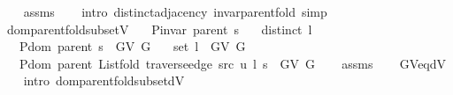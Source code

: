 \begin{isabellebody}
%
\isadelimproof
\ \ %
\endisadelimproof
%
\isatagproof
{}\isamarkupfalse%
\ assms\isanewline
\ \ \isamarkupfalse%
\ {\isacharparenleft}{\kern0pt}intro\ distinct{\isacharunderscore}{\kern0pt}adjacency\ invar{\isacharunderscore}{\kern0pt}parent{\isacharunderscore}{\kern0pt}fold{\isacharparenright}{\kern0pt}\ simp%
\endisatagproof
{\isafoldproof}%
%
\isadelimproof
%
\endisadelimproof
%
\isadelimdocument
%
\endisadelimdocument
%
\isatagdocument
%
\isamarkuptrue%
%
\endisatagdocument
{\isafolddocument}%
%
\isadelimdocument
%
\endisadelimdocument
{}\isamarkupfalse%
\ dom{\isacharunderscore}{\kern0pt}parent{\isacharunderscore}{\kern0pt}fold{\isacharunderscore}{\kern0pt}subset{\isacharunderscore}{\kern0pt}V{\isacharcolon}{\kern0pt}\isanewline
\ \ \ {\isachardoublequoteopen}P{\isacharunderscore}{\kern0pt}invar\ {\isacharparenleft}{\kern0pt}parent\ s{\isacharparenright}{\kern0pt}{\isachardoublequoteclose}\isanewline
\ \ \ {\isachardoublequoteopen}distinct\ l{\isachardoublequoteclose}\isanewline
\ \ \ {\isachardoublequoteopen}P{\isachardot}{\kern0pt}dom\ {\isacharparenleft}{\kern0pt}parent\ s{\isacharparenright}{\kern0pt}\ {\isasymsubseteq}\ G{\isachardot}{\kern0pt}V\ G{\isachardoublequoteclose}\isanewline
\ \ \ {\isachardoublequoteopen}set\ l\ {\isasymsubseteq}\ G{\isachardot}{\kern0pt}V\ G{\isachardoublequoteclose}\isanewline
\ \ \ {\isachardoublequoteopen}P{\isachardot}{\kern0pt}dom\ {\isacharparenleft}{\kern0pt}parent\ {\isacharparenleft}{\kern0pt}List{\isachardot}{\kern0pt}fold\ {\isacharparenleft}{\kern0pt}traverse{\isacharunderscore}{\kern0pt}edge\ src\ u{\isacharparenright}{\kern0pt}\ l\ s{\isacharparenright}{\kern0pt}{\isacharparenright}{\kern0pt}\ {\isasymsubseteq}\ G{\isachardot}{\kern0pt}V\ G{\isachardoublequoteclose}\isanewline
%
\isadelimproof
\ \ %
\endisadelimproof
%
\isatagproof
{}\isamarkupfalse%
\ assms\isanewline
\ \ \isamarkupfalse%
\ G{\isachardot}{\kern0pt}V{\isacharunderscore}{\kern0pt}eq{\isacharunderscore}{\kern0pt}dV\isanewline
\ \ \isamarkupfalse%
\ {\isacharparenleft}{\kern0pt}intro\ dom{\isacharunderscore}{\kern0pt}parent{\isacharunderscore}{\kern0pt}fold{\isacharunderscore}{\kern0pt}subset{\isacharunderscore}{\kern0pt}dV{\isacharparenright}{\kern0pt}%
\endisatagproof
{\isafoldproof}%
%
\isadelimproof
\isanewline
%
\endisadelimproof

\end{isabellebody}
